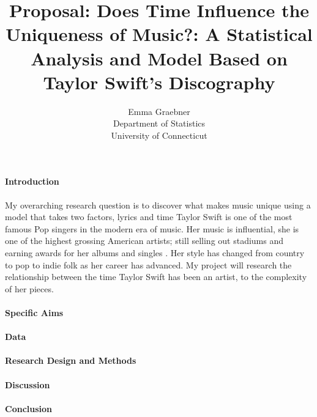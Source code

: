 \documentclass[12pt]{article}
\title{Proposal: Does Time Influence the Uniqueness of Music?: A Statistical Analysis and Model Based on Taylor Swift's Discography}
\author{Emma Graebner\\
  Department of Statistics\\
  University of Connecticut
}
\begin{document}
\maketitle


\paragraph{Introduction}
My overarching research question is to discover what makes music unique using a model that takes two factors, lyrics and time Taylor Swift is one of the most famous Pop singers in the modern era of music. Her music is influential, she is one of the highest grossing American artists; still selling out stadiums and earning awards for her albums and singles \citep{fogarty2021you} . Her style has changed from country to pop to indie folk as her career has advanced. My project will research the relationship between the time Taylor Swift has been an artist, to the complexity of her pieces. \citep{sloan2021taylor} 


\citep{perone2017words}

\paragraph{Specific Aims}


\paragraph{Data}


\paragraph{Research Design and Methods}


\paragraph{Discussion}


\paragraph{Conclusion}




\end{document}
